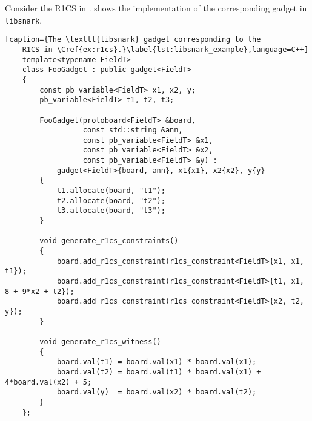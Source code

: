 \begin{example}
  Consider the R1CS in .
   shows the implementation of the corresponding gadget in 
  \texttt{libsnark}.
\end{example}

\begin{algorithm}
  \centering
  \begin{lstlisting}[caption={The \texttt{libsnark} gadget corresponding to the 
    R1CS in \Cref{ex:r1cs}.}\label{lst:libsnark_example},language=C++]
    template<typename FieldT>
    class FooGadget : public gadget<FieldT>
    {
        const pb_variable<FieldT> x1, x2, y;
        pb_variable<FieldT> t1, t2, t3;

        FooGadget(protoboard<FieldT> &board, 
                  const std::string &ann,
                  const pb_variable<FieldT> &x1, 
                  const pb_variable<FieldT> &x2, 
                  const pb_variable<FieldT> &y) : 
            gadget<FieldT>{board, ann}, x1{x1}, x2{x2}, y{y}
        {
            t1.allocate(board, "t1");
            t2.allocate(board, "t2");
            t3.allocate(board, "t3");
        }

        void generate_r1cs_constraints()
        {
            board.add_r1cs_constraint(r1cs_constraint<FieldT>{x1, x1, t1});
            board.add_r1cs_constraint(r1cs_constraint<FieldT>{t1, x1, 8 + 9*x2 + t2});
            board.add_r1cs_constraint(r1cs_constraint<FieldT>{x2, t2, y});
        }

        void generate_r1cs_witness()
        {
            board.val(t1) = board.val(x1) * board.val(x1);
            board.val(t2) = board.val(t1) * board.val(x1) + 4*board.val(x2) + 5;
            board.val(y)  = board.val(x2) * board.val(t2);
        }
    };
  \end{lstlisting}
\end{algorithm}

